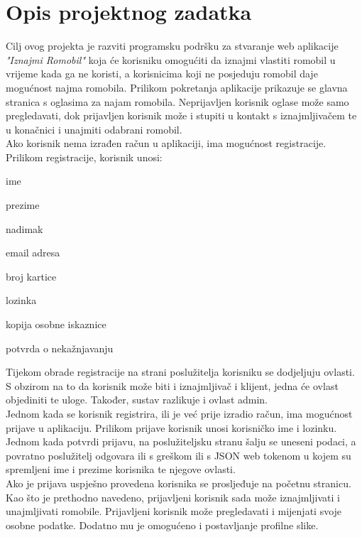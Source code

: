 \chapter{Opis projektnog zadatka}
		
		\indent Cilj ovog projekta je razviti programsku podršku za stvaranje web aplikacije \emph{"Iznajmi Romobil"} koja će korisniku omogućiti da iznajmi vlastiti romobil u vrijeme kada ga ne koristi, a korisnicima koji ne posjeduju romobil daje mogućnost najma romobila. \newline
		\indent Prilikom pokretanja aplikacije prikazuje se glavna stranica s oglasima za najam romobila. Neprijavljen korisnik oglase može samo pregledavati, dok prijavljen korisnik može i stupiti u kontakt s iznajmljivačem te u konačnici i unajmiti odabrani romobil. \\
		\indent Ako korisnik nema izrađen račun u aplikaciji, ima mogućnost registracije. Prilikom registracije, korisnik unosi:
		\begin{packed_item} 
			\item {ime}
			\item {prezime}
			\item {nadimak}
			\item {email adresa}
			\item {broj kartice}
			\item {lozinka}
			\item {kopija osobne iskaznice}
			\item {potvrda o nekažnjavanju}  
		\end{packed_item}
		\indent Tijekom obrade registracije na strani poslužitelja korisniku se dodjeljuju ovlasti. S obzirom na to da korisnik može biti i iznajmljivač i klijent, jedna će ovlast  objediniti te uloge. Također, sustav razlikuje i ovlast admin.  \\
		\indent Jednom kada se korisnik registrira, ili je već prije izradio račun, ima mogućnost prijave u aplikaciju. Prilikom prijave korisnik unosi korisničko ime i lozinku. Jednom kada potvrdi prijavu, na poslužiteljsku stranu šalju se uneseni podaci, a povratno poslužitelj odgovara ili s greškom ili s JSON web tokenom u kojem su spremljeni ime i prezime korisnika te njegove ovlasti. \\
		\indent Ako je prijava uspješno provedena korisnika se prosljeđuje na početnu stranicu. Kao što je prethodno navedeno, prijavljeni korisnik sada može iznajmljivati i unajmljivati romobile. Prijavljeni korisnik može pregledavati i mijenjati svoje osobne podatke. Dodatno mu je omogućeno i postavljanje profilne slike.\\
